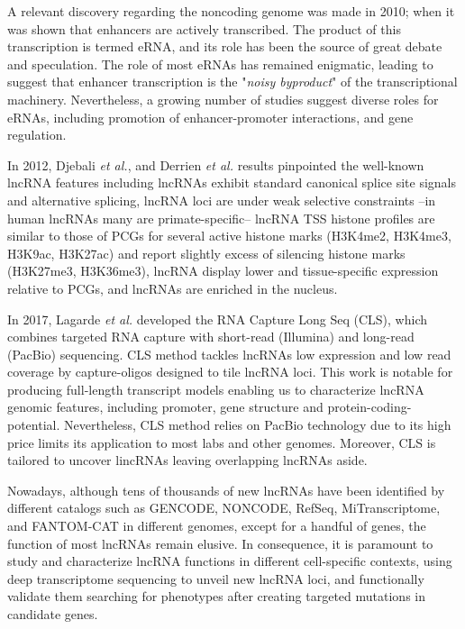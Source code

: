 A relevant discovery regarding the noncoding genome was made in 2010; when it was shown that enhancers are actively transcribed.\autocite{kim_2010_erna,de_2010_erna} The product of this transcription is termed eRNA, and its role has been the source of great debate and speculation. The role of most eRNAs has remained enigmatic, leading to suggest that enhancer transcription is the "\textit{noisy byproduct}" of the transcriptional machinery. Nevertheless, a growing number of studies suggest diverse roles for eRNAs, including promotion of enhancer-promoter interactions, and gene regulation.\autocite{arnold_2020_diversity,kim_2015_erna}

In 2012, Djebali \textit{et al.}, and Derrien \textit{et al.} results pinpointed the well-known lncRNA features including lncRNAs exhibit standard canonical splice site signals and alternative splicing, lncRNA loci are under weak selective constraints --in human lncRNAs many are primate-specific-- lncRNA TSS histone profiles are similar to those of PCGs for several active histone marks (H3K4me2, H3K4me3, H3K9ac, H3K27ac) and report slightly excess of silencing histone marks (H3K27me3, H3K36me3), lncRNA display lower and tissue-specific expression relative to PCGs, and lncRNAs are enriched in the nucleus.\autocite{derrien_2012_gencode,djebali_2012_landscape}

In 2017, Lagarde \textit{et al.} developed the RNA Capture Long Seq (CLS), which combines targeted RNA capture with short-read (Illumina) and long-read (PacBio) sequencing.\autocite{lagarde_2017_capture} CLS method tackles lncRNAs low expression and low read coverage by capture-oligos designed to tile lncRNA loci. This work is notable for producing full-length transcript models enabling us to characterize lncRNA genomic features, including promoter, gene structure and protein-coding-potential. Nevertheless, CLS method relies on PacBio technology due to its high price limits its application to most labs and other genomes. Moreover, CLS is tailored to uncover lincRNAs leaving overlapping lncRNAs aside.  

Nowadays, although tens of thousands of new lncRNAs have been identified by different catalogs such as GENCODE,\autocite{frankish_2021_gencode} NONCODE,\autocite{zhao_2021_noncodev6} RefSeq,\autocite{oleary_2016_refseq} MiTranscriptome,\autocite{iyer_2015_mitranscriptome} and FANTOM-CAT\autocite{hon_2017_fantom_cat} in different genomes, except for a handful of genes, the function of most lncRNAs remain elusive. In consequence, it is paramount to study and characterize lncRNA functions in different cell-specific contexts, using deep transcriptome sequencing to unveil new lncRNA loci, and functionally validate them searching for phenotypes after creating targeted mutations in candidate genes. 

